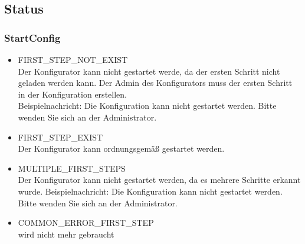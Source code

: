 \documentclass{article}
\begin{document}
%     
%     
%     
%     
%     
%     
    

\subsection{Status}

\subsubsection{StartConfig}

\begin{itemize}
	\item FIRST\_STEP\_NOT\_EXIST\\
		Der Konfigurator kann nicht gestartet werde, da der ersten 
		Schritt nicht geladen werden kann. Der Admin des Konfigurators
		muss der ersten Schritt in der Konfiguration erstellen.\\
		Beispielnachricht: Die Konfiguration kann nicht gestartet werden. 
		Bitte wenden Sie sich an der Administrator.
	\item FIRST\_STEP\_EXIST\\
		Der Konfigurator kann ordnungsgemäß gestartet werden.
	\item MULTIPLE\_FIRST\_STEPS\\
		Der Konfigurator kann nicht gestartet werden, da es mehrere
		Schritte erkannt wurde.
		Beispielnachricht: Die Konfiguration kann nicht gestartet werden. 
		Bitte wenden Sie sich an der Administrator.
	\item COMMON\_ERROR\_FIRST\_STEP\\
		wird nicht mehr gebraucht
\end{itemize}
\end{document}
